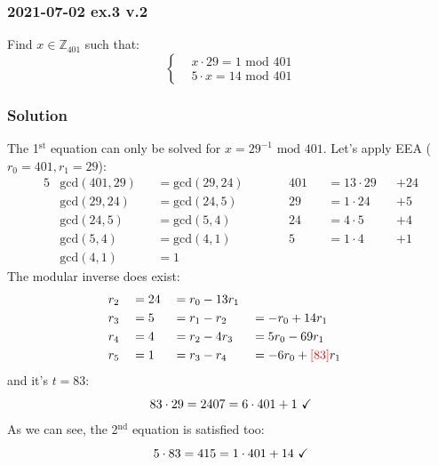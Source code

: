 \documentclass[11pt, a4paper]{article}
\newcommand{\mymod}{
    \text{ mod }
}
\begin{document}
\newpage
\subsubsection{2021-07-02 ex.3 v.2}
Find $x\in\mathbb{Z}_{401}$ such that:
\begin{equation*}
  \left\{
    \begin{aligned}
      & x\cdot29=1\mymod401 \\
      & 5\cdot x=14\mymod401
    \end{aligned}
  \right.
\end{equation*}
\subsubsection*{Solution}
The 1$^\text{st}$ equation can only be solved for $x=29^{-1}\mymod401$. Let's apply EEA ($r_0=401, r_1=29$):
\begin{alignat*}{5}
    &\text{gcd}(401,29)&&=\text{gcd}(29,24)\qquad&&401&&=13\cdot29&&+24\\
    &\text{gcd}(29,24)&&=\text{gcd}(24,5)\qquad&&29&&=1\cdot24&&+5\\
    &\text{gcd}(24,5)&&=\text{gcd}(5,4)\qquad&&24&&=4\cdot5&&+4\\
    &\text{gcd}(5,4)&&=\text{gcd}(4,1)\qquad&&5&&=1\cdot4&&+1\\
    &\text{gcd}(4,1)&&=1
\end{alignat*}
The modular inverse does exist:
\begin{alignat*}{4}
    &r_2&&=24&&=r_0-13r_1\\
    &r_3&&=5&&=r_1-r_2&&=-r_0+14r_1\\
    &r_4&&=4&&=r_2-4r_3&&=5r_0-69r_1\\
    &r_5&&=1&&=r_3-r_4&&=-6r_0+\textcolor{red}{[83]}r_1
\end{alignat*}
and it's $t=83$:
$$83\cdot29=2407=6\cdot401+1\text{ \checkmark}$$
As we can see, the 2$^\text{nd}$ equation is satisfied too:
$$5\cdot83=415=1\cdot401+14\text{ \checkmark}$$
\end{document}
